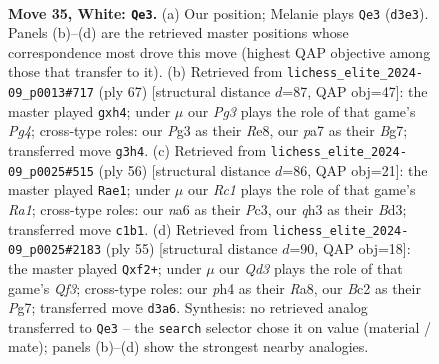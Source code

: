 \documentclass[11pt]{article}
\begin{document}
\clearpage

\begin{figure}[p]\centering
\begin{subfigure}{0.46\textwidth}\centering
\resizebox{\linewidth}{!}{%
\newchessgame
\chessboard[
  setfen={1r6/pp4k1/n5p1/2pP1bp1/7p/P2Q1PPq/1PB4P/2RR2K1 w - - 2 35},
  showmover=false,
  pgfstyle=straightmove, color=movearrow, markmove={d3-e3}
]}
\caption{}
\end{subfigure}\hfill
\begin{subfigure}{0.46\textwidth}\centering
\resizebox{\linewidth}{!}{%
\newchessgame
\chessboard[
  setfen={4rrk1/6b1/2q4p/pN4pQ/P1P1p2P/1P1pB3/3N2P1/4R1K1 b - - 1 34},
  showmover=false,
  pgfstyle=straightmove, color=movearrow, markmove={g5-h4}
]}
\caption{}
\end{subfigure}
\\[4pt]
\begin{subfigure}{0.46\textwidth}\centering
\resizebox{\linewidth}{!}{%
\newchessgame
\chessboard[
  setfen={3r3k/p4p1p/1p1qb1p1/3n4/3PQ3/2PB4/PP4PP/R4RK1 w - - 0 29},
  showmover=false,
  pgfstyle=straightmove, color=movearrow, markmove={a1-e1}
]}
\caption{}
\end{subfigure}\hfill
\begin{subfigure}{0.46\textwidth}\centering
\resizebox{\linewidth}{!}{%
\newchessgame
\chessboard[
  setfen={r4r1k/1pQ3p1/p2p1q1p/P2Pp1B1/4P1B1/7P/1P3PP1/2R3K1 b - - 0 28},
  showmover=false,
  pgfstyle=straightmove, color=movearrow, markmove={f6-f2}
]}
\caption{}
\end{subfigure}
\caption{\textbf{Move 35, White: \texttt{Qe3}.} (a) Our position; Melanie plays \texttt{Qe3} (\texttt{d3e3}). Panels (b)--(d) are the retrieved master positions whose correspondence most drove this move (highest QAP objective among those that transfer to it). (b) Retrieved from \texttt{lichess\_elite\_2024-09\_p0013\#717} (ply 67) [structural distance $d$=87, QAP obj=47]: the master played \texttt{gxh4}; under $\mu$ our \emph{Pg3} plays the role of that game's \emph{Pg4}; cross-type roles: our \emph{P}g3 as their \emph{R}e8, our \emph{p}a7 as their \emph{B}g7; transferred move \texttt{g3h4}. (c) Retrieved from \texttt{lichess\_elite\_2024-09\_p0025\#515} (ply 56) [structural distance $d$=86, QAP obj=21]: the master played \texttt{Rae1}; under $\mu$ our \emph{Rc1} plays the role of that game's \emph{Ra1}; cross-type roles: our \emph{n}a6 as their \emph{P}c3, our \emph{q}h3 as their \emph{B}d3; transferred move \texttt{c1b1}. (d) Retrieved from \texttt{lichess\_elite\_2024-09\_p0025\#2183} (ply 55) [structural distance $d$=90, QAP obj=18]: the master played \texttt{Qxf2+}; under $\mu$ our \emph{Qd3} plays the role of that game's \emph{Qf3}; cross-type roles: our \emph{p}h4 as their \emph{R}a8, our \emph{B}c2 as their \emph{P}g7; transferred move \texttt{d3a6}. Synthesis: no retrieved analog transferred to \texttt{Qe3} -- the \texttt{search} selector chose it on value (material / mate); panels (b)--(d) show the strongest nearby analogies.}
\label{fig:thought-m68}
\end{figure}
\end{document}

